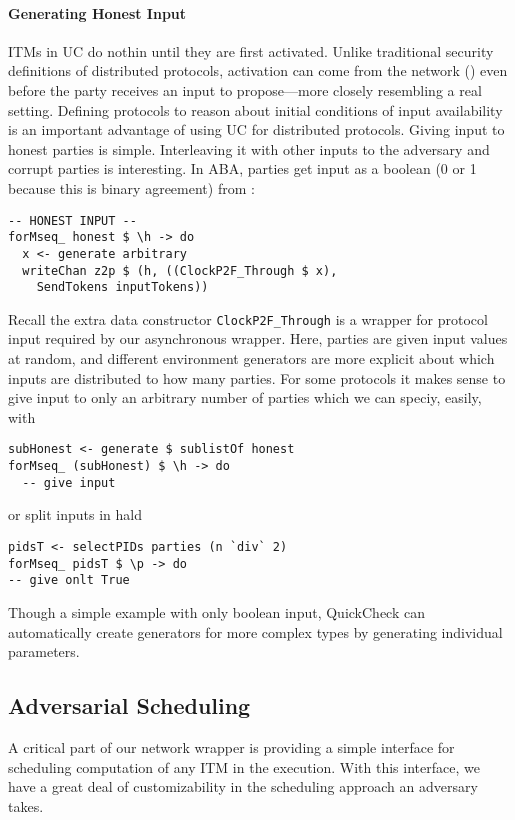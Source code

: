 \paragraph{Generating Honest Input}
ITMs in UC do nothin until they are first activated.
Unlike traditional security definitions of distributed protocols, activation can come from the network (\Fchan) even before the party receives an input to propose---more closely resembling a real setting.
Defining protocols to reason about initial conditions of input availability is an important advantage of using UC for distributed protocols.
Giving input to honest parties is simple. Interleaving it with other inputs to the adversary and corrupt parties is interesting.
In ABA, parties get input as a boolean (0 or 1 because this is binary agreement) from \Z:
\begin{lstlisting}
-- HONEST INPUT --
forMseq_ honest $ \h -> do
  x <- generate arbitrary
  writeChan z2p $ (h, ((ClockP2F_Through $ x), 
    SendTokens inputTokens))
\end{lstlisting}
Recall the extra data constructor \texttt{ClockP2F\_Through} is a wrapper for protocol input required by our asynchronous wrapper.
Here, parties are given input values at random, and different environment generators are more explicit about which inputs are distributed to how many parties.
For some protocols it makes sense to give input to only an arbitrary number of parties which we can speciy, easily, with 
\begin{lstlisting}
subHonest <- generate $ sublistOf honest
forMseq_ (subHonest) $ \h -> do  
  -- give input
\end{lstlisting}
or split inputs in hald
\begin{lstlisting}
pidsT <- selectPIDs parties (n `div` 2)
forMseq_ pidsT $ \p -> do
-- give onlt True
\end{lstlisting}
Though a simple example with only boolean input, QuickCheck can automatically create generators for more complex types by generating individual parameters. 

\subsection{Adversarial Scheduling}
A critical part of our network wrapper is providing a simple interface for scheduling computation of any ITM in the execution.
With this interface, we have a great deal of customizability in the scheduling approach an adversary takes. 

